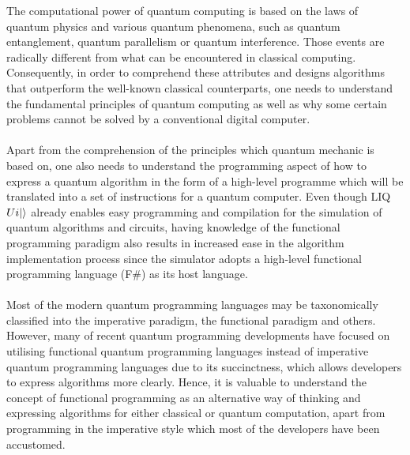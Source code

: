 \documentclass[12pt]{third-rep}
\begin{document}
\noindent The computational power of quantum computing is based on the laws of quantum physics and various quantum phenomena, such as quantum entanglement,  quantum parallelism or quantum interference. Those events are radically different from what can be encountered in classical computing. Consequently, in order to comprehend these attributes and designs algorithms that outperform the well-known classical counterparts, one needs to understand the fundamental principles of quantum computing as well as why some certain problems cannot be solved by a conventional digital computer. \\\\
Apart from the comprehension of the principles which quantum mechanic is based on, one also needs to understand the programming aspect of how to express a quantum algorithm in the form of a high-level programme which will be translated into a set of instructions for a quantum computer. Even though LIQ$Ui{\left\vert{}\right\rangle}$ already enables easy programming and compilation for the simulation of quantum algorithms and circuits, having knowledge of the functional programming paradigm also results in increased ease in the algorithm implementation process since the simulator adopts a high-level functional programming language (F\#) as its host language. \\\\
Most of the modern quantum programming languages may be taxonomically classified into the imperative paradigm, the functional paradigm and others. However, many of recent quantum programming developments have focused on utilising functional quantum programming languages instead of imperative quantum programming languages due to its succinctness, which allows developers to express algorithms more clearly. Hence, it is valuable to understand the concept of functional programming as an alternative way of thinking and expressing algorithms for either classical or quantum computation, apart from programming in the imperative style which most of the developers have been accustomed.

\nocite{liquid-manual,circuit-tut}

\appendix

\titleformat{\chapter}{\normalfont\huge\bf}{\chaptertitlename \ \thechapter\ \ \ --}{20pt}{\huge\bf} 
\end{document}
